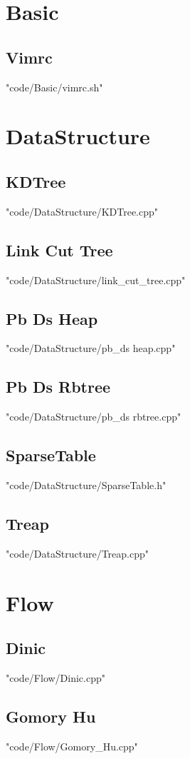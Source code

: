 


\section{Basic}
\subsection{Vimrc}
 {"code/Basic/vimrc.sh"}
\section{DataStructure}
\subsection{KDTree}
 {"code/DataStructure/KDTree.cpp"}
\subsection{Link Cut Tree}
 {"code/DataStructure/link_cut_tree.cpp"}
\subsection{Pb Ds Heap}
 {"code/DataStructure/pb_ds heap.cpp"}
\subsection{Pb Ds Rbtree}
 {"code/DataStructure/pb_ds rbtree.cpp"}
\subsection{SparseTable}
 {"code/DataStructure/SparseTable.h"}
\subsection{Treap}
 {"code/DataStructure/Treap.cpp"}
\section{Flow}
\subsection{Dinic}
 {"code/Flow/Dinic.cpp"}
\subsection{Gomory Hu}
 {"code/Flow/Gomory_Hu.cpp"}
